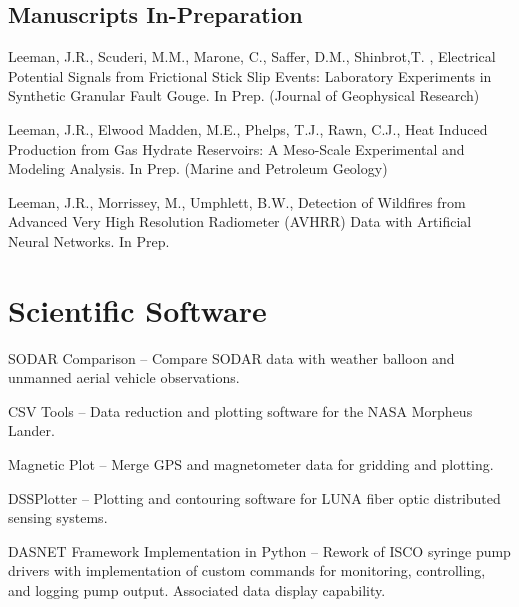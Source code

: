 \documentclass[letterpaper]{article}
\renewenvironment{itemize}{
  \begin{list}{}{
    \setlength{\leftmargin}{1.5em}
  }
}{
  \end{list}
}
\begin{document}
\subsection*{Manuscripts In-Preparation}
\begin{itemize}

\item Leeman, J.R., Scuderi, M.M., Marone, C., Saffer, D.M., Shinbrot,T. , Electrical Potential Signals from Frictional Stick Slip Events: Laboratory Experiments  in Synthetic Granular Fault Gouge. In Prep. (Journal of Geophysical Research)

\item Leeman, J.R., Elwood Madden, M.E., Phelps, T.J., Rawn, C.J., Heat Induced Production from Gas Hydrate Reservoirs: A Meso-Scale Experimental and Modeling Analysis.  In Prep. (Marine and Petroleum Geology)

\item Leeman, J.R., Morrissey, M., Umphlett, B.W., Detection of Wildfires from Advanced Very High Resolution Radiometer (AVHRR) Data with Artificial Neural Networks.  In Prep.
\end{itemize}


\section*{Scientific Software}
\begin{itemize}
\item SODAR Comparison --  Compare SODAR data with weather balloon and unmanned aerial vehicle observations.
\item CSV Tools -- Data reduction and plotting software for the NASA Morpheus Lander.
\item Magnetic Plot -- Merge GPS and magnetometer data for gridding and plotting.
\item DSSPlotter -- Plotting and contouring software for LUNA fiber optic distributed sensing systems.
\item DASNET Framework Implementation in Python -- Rework of ISCO syringe pump drivers with implementation of custom commands for monitoring, controlling, and logging pump output. Associated data display capability.
\end{itemize}
\end{document}
